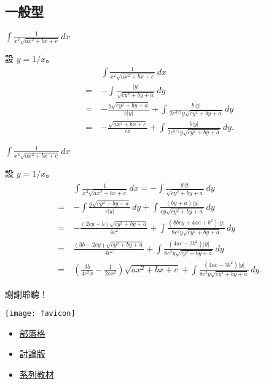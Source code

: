 \documentclass{beamer}
\theoremstyle{remark}
\begin{document}
\begin{CJK}{UTF8}{bsmi}
\subsection{一般型}
\begin{frame}{$\displaystyle \int \frac{1}{x^2 \sqrt{ax^2 + bx + c}}\,dx$}
  \begin{solution}
    設 $y = 1/x$。
    \begin{align*}
	 & \int \frac{1}{x^2 \sqrt{ax^2 + bx + c}}\,dx\\
      =\:& -\int \frac{|y|}{\sqrt{cy^2 + by + a}}\,dy\\
      =\:& -\frac{y \sqrt{cy^2 + by + a}}{c \left| y \right|} + \int \frac{b \left| y \right|}
	   {2c^{3/2}y \sqrt{cy^2 + by + a}}\,dy\\
      =\:& -\frac{\sqrt{ax^2 + bx + c}}{cx} + \int \frac{b \left| y \right|} {2c^{3/2}y \sqrt{cy^2 + by + a}}\,dy.
    \end{align*}
  \end{solution}
\end{frame}

\begin{frame}{$\displaystyle \int \frac{1}{x^3 \sqrt{ax^2 + bx + c}}\,dx$}
  \begin{solution}
    設 $y = 1/x$。
    \small
    \begin{align*}
	 & \int \frac{1}{x^3 \sqrt{ax^2 + bx + c}}\,dx = -\int \frac{y \left| y \right|}{\sqrt{cy^2 + by + a}}\,dy\\
      =\:& -\int \frac{y \sqrt{cy^2 + by + a}}{c \left| y \right|}\,dy + \int \frac{\left( by + a \right) |y|}
	   {cy \sqrt{cy^2 + by + a}}\,dy\\
      =\:& -\frac{\left( 2cy + b \right) \sqrt{cy^2 + by + a}}{4c^2} + \int \frac{\left( 8bcy + 4ac + b^2 \right) |y|}
	   {8c^2 y \sqrt{cy^2 + by + a}}\,dy\\
      =\:& \frac{\left( 3b - 2cy \right) \sqrt{cy^2 + by + a}}{4c^2} + \int \frac{\left( 4ac - 3b^2 \right) |y|}
	   {8c^2 y \sqrt{cy^2 + by + a}}\,dy\\
      =\:& \left( \frac{3b}{4c^2 x} - \frac{1}{2cx^2} \right) \sqrt{ax^2 + bx + c} + \int \frac{\left( 4ac - 3b^2 \right) |y|}
	   {8c^2 y \sqrt{cy^2 + by + a}}\,dy.
    \end{align*}
  \end{solution}
\end{frame}

\begin{frame}{謝謝聆聽！}
  \begin{center}
    \texttt{[image: favicon]}
  \end{center}
  \begin{itemize}
    \item \href{http://jdh8.org/}{部落格}
    \item \href{http://boards.jdh8.org/cal/}{討論版}
    \item \href{https://github.com/jdh8/calculus-2012}{系列教材}
  \end{itemize}
\end{frame}
\end{CJK}
\end{document}
